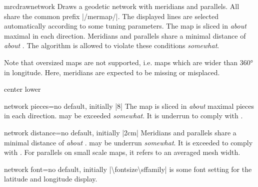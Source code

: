 \begin{docCommand}{mrcdrawnetwork}{}
  Draws a geodetic network with meridians and parallels.
  All  share the common prefix |/mermap/|.
  The displayed lines are selected automatically according to some tuning
  parameters.
  The map is sliced in \emph{about} maximal  in each
  direction. Meridians and parallels share a minimal distance of
  \emph{about} . The algorithm is
  allowed to violate these conditions \emph{somewhat}.

  Note that oversized maps are not supported, i.e. maps which are wider
  than \ang{360} in longitude. Here, meridians are expected to be missing
  or misplaced.

%
\begin{dispExample*}{center lower}
\end{dispExample*}
\end{docCommand}


\begin{docMrcKey}{network pieces}{=}{no default, initially |8|}
  The map is sliced in \emph{about} maximal  pieces in each
  direction.  may be exceeded \emph{somewhat}.
  It is underrun to comply with .
\end{docMrcKey}


\begin{docMrcKey}{network distance}{=}{no default, initially |2cm|}
  Meridians and parallels share a minimal distance of
  \emph{about} .
   may be underrun \emph{somewhat}.
  It is exceeded to comply with .
  For parallels on small scale maps, it refers to an averaged mesh width.
\end{docMrcKey}

\begin{docMrcKey}{network font}{=}{no default, initially
  |\textbackslash fontsize\brackets{4pt}\brackets{4pt}\textbackslash sffamily|}
   is some font setting for the latitude and longitude display.
\end{docMrcKey}



